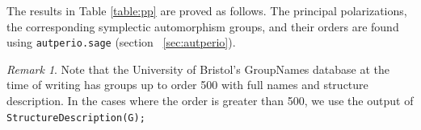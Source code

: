 \documentclass[12pt,reqno]{amsart}
\theoremstyle{definition}
\theoremstyle{remark}
\newtheorem*{remark}{Remark}
\begin{document}
The results in Table \ref{table:pp} are proved as follows. The principal polarizations, the corresponding symplectic automorphism groups, and their orders are found using \texttt{autperio.sage} (section ~\ref{sec:autperio}).   


\begin{remark} Note that the University of Bristol's GroupNames database at the time of writing has groups up to order 500 with full names and structure description. In the cases where the order is greater than 500, we use the output of \texttt{StructureDescription(G);}  \end{remark}

\newpage
\end{document}
